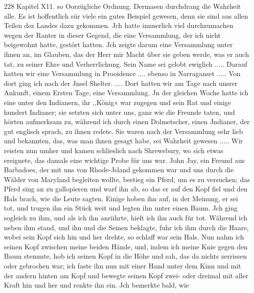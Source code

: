 228 Kapitel X11.
so Oorzügliche Ordnung. Dermasen durchdrang die Wahrheit
alle. Es ist hoffentlich sür viele ein gutes Beispiel gewesen, denn
sie sind aus allen Teilen dez Landes dazu gekommen. Jch hatte
innnerlich viel durchzumachen wegen der Ranter in dieser Gegend,
die eine Versammlung, der ich nicht beigewohnt hatte, gestört
hatten. Jch zeigte darum eine Versammlung unter ihnen an, im
Glauben, das der Herr mir Macht über sie geben werde, was
er auch tat, zu seiner Ehre und Verherrlichung. Sein Name
sei gelobt ewiglich .....
Darauf hatten wir eine Versammlung in Prooidence ....
ebenso in Narraganset ..... Von dort ging ich nach der Jnsel
Shelter. .... Dort hatten wir am Tage nach unsrer Ankunft,
einem Ersten Tage, eine Versammlung. Jn der gleichen Woche hatte
ich eine unter den Indianern, ihr ,,König« war zugegen und sein
Rat und einige hundert Indianer; sie setzten sich unter uns, ganz
wie die Freunde taten, und hörten aufmerksam zu, während ich
durch einen Dolmetscher, einen Jndianer, der gut englisch sprach,
zu ihnen redete. Sie waren nach der Versammlung sehr lieb
und bekannten, das, was man ihnen gesagt habe, sei Wahrheit
gewesen .....
Wir reisten nun umher und kamen schlieslich nach Shrewsbury,
wo sich etwas ereignete, das damals eine wichtige Probe für uns
war. John Jay, ein Freund aus Barbadoes, der mit uns von
Rhode-Jsland gekommen war und uns durch die Wälder von
Maryland begleiten wollte, bestieg ein Pferd, um es zu versuchen;
das Pferd sing an zu gallopieren und warf ihn ab, so das er
auf den Kopf fiel und den Hals brach, wie die Leute sagten.
Einige hoben ihn auf, in der Meinung, er sei tot, und trugen
ihn ein Stück weit und legten ihn unter einen Baum. Jch ging
sogleich zu ihm, und als ich ihn anriihrte, hielt ich ihn auch für
tot. Während ich neben ihm stand, und ihn und die Seinen
beklagte, fuhr ich ihm durch die Haare, wobei sein Kopf sich hin
und her drehte, so schlaff war sein Hals. Nun nahm ich seinen
Kopf zwischen meine beiden Hände, und, indem ich meine Knie
gegen den Baum stemmte, hob ich seinen Kopf in die Höhe und
sah, das da nichts zerrissen oder gebrochen war; ich faste ihn
nun mit einer Hand unter dem Kinn und mit der andern hinten
am Kopf und bewegte seinen Kopf zwei- oder dreimal mit aller
Kraft hin und her und renkte ihn ein. Jch bemerkte bald, wie


